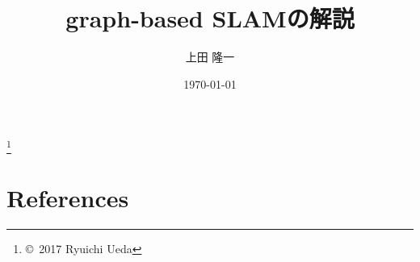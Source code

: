 \documentclass[11pt,a4paper]{jsarticle}
\title{graph-based SLAMの解説}
\author{上田 隆一}
\date{\today}
\begin{document}
\maketitle

\footnote[0]{\copyright\ 2017 Ryuichi Ueda}
%
%

%
%
\section*{References}



\end{document}

